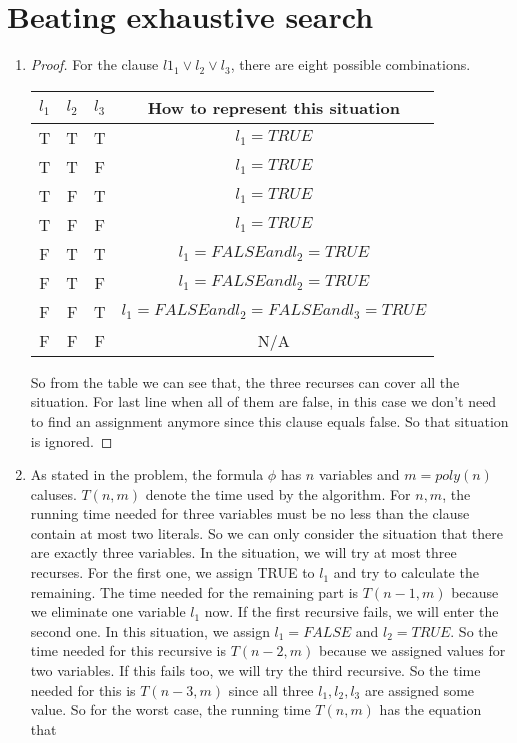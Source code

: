 \documentclass{article}
\begin{document}
	\section{Beating exhaustive search}
		\begin{enumerate}
			\item \begin{proof}
				For the clause $l1_1 \vee l_2 \vee l_3$, there are eight possible combinations.\newline  \begin{tabular}{|c|c|c|c|}
				\hline
				$l_1$ & $l_2$ & $l_3$ & How to represent this situation \\
				\hline
				T & T & T & $l_1 = TRUE$ \\
				\hline
				T & T & F & $l_1 = TRUE$ \\
				\hline
				T & F & T & $l_1 = TRUE$ \\
				\hline
				T & F & F & $l_1 = TRUE$ \\
				\hline
				F & T & T & $l_1 = FALSE and l_2 = TRUE$ \\
				\hline
				F & T & F & $l_1 = FALSE and l_2 = TRUE$ \\
				\hline
				F & F & T & $l_1 = FALSE and l_2 = FALSE and l_3 = TRUE$ \\
				\hline
				F & F & F & N/A \\
				\hline
			\end{tabular} \newline
			So from the table we can see that, the three recurses can cover all the situation. For last line when all of them are false, in this case we don't need to find an assignment anymore since this clause equals false. So that situation is ignored. \end{proof}
			\item As stated in the problem, the formula $\phi$ has $n$ variables and $m = poly(n)$ caluses. $T(n, m)$ denote the time used by the algorithm. For $n, m$, the running time needed for three variables must be no less than the clause contain at most two literals. So we can only consider the situation that there are exactly three variables. In the situation, we will try at most three recurses. For the first one, we assign TRUE to $l_1$ and try to calculate the remaining. The time needed for the remaining part is $T(n - 1, m)$ because we eliminate one variable $l_1$ now. If the first recursive fails, we will enter the second one. In this situation, we assign $l_1 = FALSE$ and $l_2 = TRUE$. So the time needed for this recursive is $T(n - 2, m)$ because we assigned values for two variables. If this fails too, we will try the third recursive. So the time needed for this is $T(n - 3, m)$ since all three $l_1, l_2, l_3$ are assigned some value. So for the worst case, the running time $T(n, m)$ has the equation that

\end{enumerate}
\end{document}
